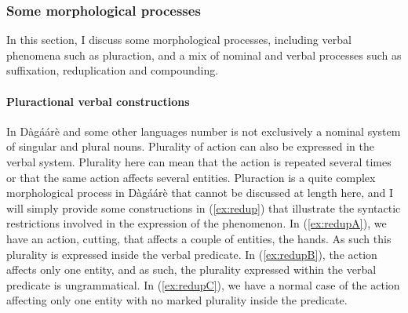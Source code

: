 \begin{refsection}
\subsubsection{Some morphological processes}
In this section, I discuss some morphological processes, including verbal phenomena
such as pluraction, and a mix of nominal and verbal processes such as suffixation,
reduplication and compounding.

\paragraph{Pluractional verbal constructions}
In Dàgáárè and some other languages number is not exclusively a nominal system of
singular and plural nouns. Plurality of action can also be expressed in the verbal system.
Plurality here can mean that the action is repeated several times or that the same action affects
several entities. Pluraction is a quite complex morphological process in Dàgáárè that cannot
be discussed at length here, and I will simply provide some constructions in (\ref{ex:redup}) that illustrate
the syntactic restrictions involved in the expression of the phenomenon.
In (\ref{ex:redupA}), we have an action, cutting, that affects a couple of entities, the hands. As
such this plurality is expressed inside the verbal predicate. In (\ref{ex:redupB}), the action affects only
one entity, and as such, the plurality expressed within the verbal predicate is ungrammatical.
In (\ref{ex:redupC}), we have a normal case of the action affecting only one entity with no marked
plurality inside the predicate.

\ea \label{ex:redup} 
\z\z




\end{refsection}
